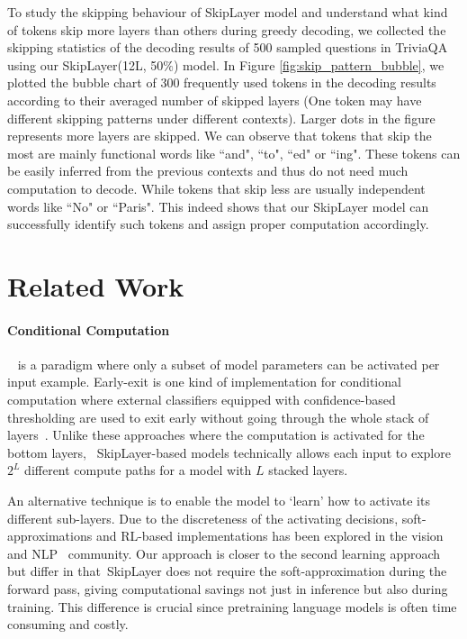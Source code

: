 \documentclass{article}
\newcommand{\skipl}{SkipLayer\xspace}
\begin{document}
To study the skipping behaviour of \skipl model and understand what kind of tokens skip more layers than others during greedy decoding, we collected the skipping statistics of the decoding results of 500 sampled questions in TriviaQA using our \skipl (12L, 50$\%$) model. In Figure \ref{fig:skip_pattern_bubble}, we plotted the bubble chart of 300 frequently used tokens in the decoding results according to their averaged number of skipped layers (One token may have different skipping patterns under different contexts). Larger dots in the figure represents more layers are skipped. We can observe that tokens that skip the most are mainly functional words like ``and", ``to", ``ed" or ``ing". These tokens can be easily inferred from the previous contexts and thus do not need much computation to decode. While tokens that skip less are usually independent words like ``No" or ``Paris". This indeed shows that our \skipl model can successfully identify such tokens and assign proper computation accordingly.


\section{Related Work}
\paragraph{Conditional Computation}~\cite{BengioLC13, BengioBPP15}
is a paradigm where only a subset of model parameters can be activated per input example. Early-exit is one kind of implementation for conditional computation where external classifiers equipped with confidence-based thresholding are used to exit early without going through the whole stack of layers~\cite{WangLCTG17, xin2020deebert, schwartz-etal-2020-right, liu-etal-2020-fastbert, DabreRF20, ElbayadGGA20, tal22}.
Unlike these approaches where the computation is activated for the bottom layers, ~\skipl-based models technically allows each input to explore $2^{L}$ different compute paths for a model with $L$ stacked layers.

An alternative technique is to enable the model to `learn' how to activate its different sub-layers. Due to the discreteness of the activating decisions, soft-approximations and RL-based implementations has been explored in the vision~\cite{srivastava2015highway, WangYDDG18} and NLP~\cite{bapna2020controlling} community. Our approach is closer to the second learning approach but differ in that~\skipl does not require the soft-approximation during the forward pass, giving computational savings not just in inference but also during training. This difference is crucial since pretraining language models is often time consuming and costly.
\end{document}
